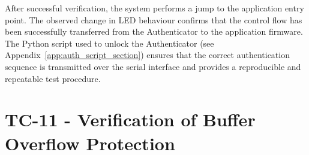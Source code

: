 After successful verification, the system performs a jump to the application entry point. The observed change in LED behaviour confirms that the control flow has been successfully transferred from the Authenticator to the application firmware. The Python script used to unlock the Authenticator (see Appendix~\ref{app:auth_script_section}) ensures that the correct authentication sequence is transmitted over the serial interface and provides a reproducible and repeatable test procedure.

\newpage

\section{TC-11 - Verification of Buffer Overflow Protection}
\label{sec:tc13}

\renewcommand{\arraystretch}{1.4}

